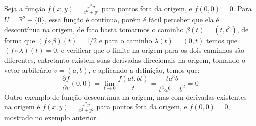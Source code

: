 Seja a função $f(x,y) = \frac{x^3y}{x^6+y^2}$ para pontos fora da origem, e $f(0,0) = 0$. Para $U = \mathbb{R}^2-\{0\}$, essa função é contínua, porém é fácil perceber que ela é descontínua na origem, de fato basta tomarmos o caminho $\beta(t) = (t,t^3)$, de forma que $(f\circ \beta)(t) = 1/2$ e para o caminho $\lambda(t) = (0,t)$ temos que $(f\circ\lambda)(t) = 0$, e verificar que o limite na origem para os dois caminhos são diferentes, entretanto existem suas derivadas direcionais na origem, tomando o vetor arbitrário $v = (a,b)$, e aplicando a  definição, temos que:
%
\[
\frac{\partial f}{\partial v}(0,0) 
= \lim_{t \to 0}\frac{f(at,bt)}{t} 
= \frac{ta^3b}{t^4a^6+b^2} = 0
\]
%
Outro exemplo de função descontínua na origem, mas com derivadas 
existentes na origem é $f(x,y) = \frac{x^2y}{x^2+y^2}$ para pontos 
fora da origem, e $f(0,0) = 0$, mostrado no exemplo anterior. 

